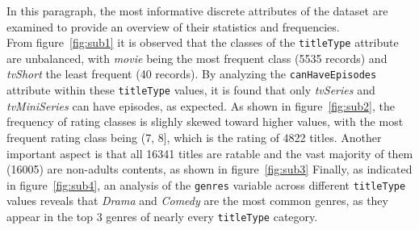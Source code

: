 In this paragraph, the most informative discrete attributes of the dataset are examined to provide an overview of their statistics and frequencies. \\
From figure~\ref{fig:sub1} it is observed that the classes of the \texttt{titleType} attribute are unbalanced, with \textit{movie} being 
the most frequent class (5535 records) and \textit{tvShort} the least frequent (40 records). 
By analyzing the \texttt{canHaveEpisodes} attribute within these \texttt{titleType} values, it is found that only \textit{tvSeries} and 
\textit{tvMiniSeries} can have episodes, as expected.
As shown in figure~\ref{fig:sub2}, the frequency of rating classes is slighly skewed toward higher values, with the most frequent rating 
class being (7, 8], which is the rating of 4822 titles.
Another important aspect is that all 16341 titles are ratable and the vast majority of them (16005) are non-adults contents, as shown 
in figure~\ref{fig:sub3}
Finally, as indicated in figure~\ref{fig:sub4}, an analysis of the \texttt{genres} variable across different \texttt{titleType} values 
reveals that \textit{Drama} and \textit{Comedy} are the most common genres, as they appear in the top 3 genres of nearly every \texttt{titleType} category.


